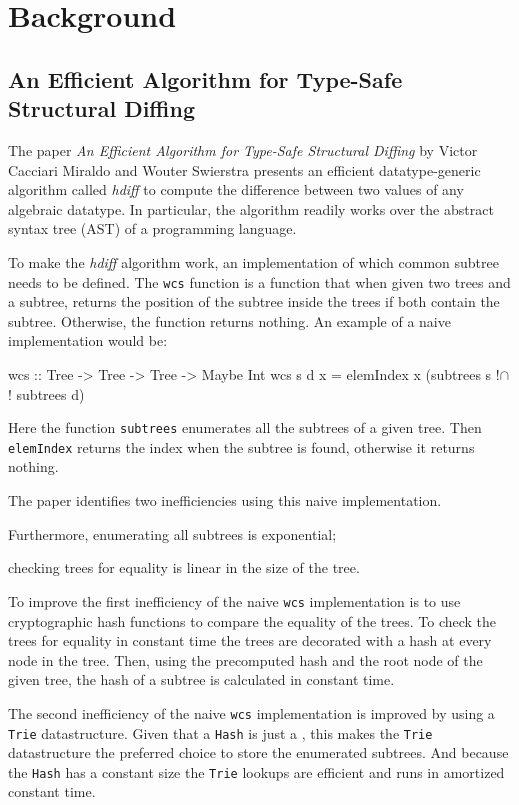 \section{Background}

\subsection{An Efficient Algorithm for Type-Safe Structural Diffing}
\label{sec-efficient-struct-diff}
The paper \textit{An Efficient Algorithm for Type-Safe Structural Diffing} by Victor Cacciari Miraldo and Wouter Swierstra presents an efficient datatype-generic algorithm called \textit{hdiff} to compute the difference between two values of any algebraic datatype. In particular, the algorithm readily works over the abstract syntax tree (AST) of a programming language\cite{miraldo2019efficient}.

To make the \textit{hdiff} algorithm work, an implementation of which common subtree needs to be defined. The \texttt{wcs} function is a function that when given two trees and a subtree, returns the position of the subtree inside the trees if both contain the subtree. Otherwise, the function returns nothing. An example of a naive implementation would be:

\begin{haskell}
wcs :: Tree -> Tree -> Tree -> Maybe Int
wcs s d x = elemIndex x (subtrees s !$\cap$! subtrees d) 
\end{haskell}

Here the function \texttt{subtrees} enumerates all the subtrees of a given tree. Then \texttt{elemIndex} returns the index when the subtree is found, otherwise it returns nothing. 

The paper identifies two inefficiencies using this naive implementation.
\begin{enumerate*}[label=(\Alph*)]
    \item Furthermore, enumerating all subtrees is exponential;
    \item checking trees for equality is linear in the size of the tree.
\end{enumerate*}

To improve the first inefficiency of the naive \texttt{wcs} implementation is to use cryptographic hash functions to compare the equality of the trees. To check the trees for equality in constant time the trees are decorated with a hash at every node in the tree. Then, using the precomputed hash and the root node of the given tree, the hash of a subtree is calculated in constant time.

The second inefficiency of the naive \texttt{wcs} implementation is improved by using a \texttt{Trie}\cite{brass2008trie} datastructure. Given that a \texttt{Hash} is just a \inlinehaskell{[Char]}, this makes the \texttt{Trie} datastructure the preferred choice to store the enumerated subtrees. And because the \texttt{Hash} has a constant size the \texttt{Trie} lookups are efficient and runs in amortized constant time.

